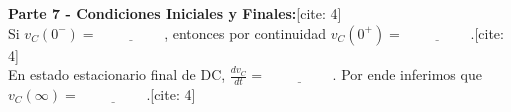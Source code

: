 \documentclass[11pt, a4paper]{article}
\begin{document}
\vspace{0.5cm}
\textbf{Parte 7 - Condiciones Iniciales y Finales:}[cite: 4]\\
Si $v_C(0^-) = \underline{\hspace{2cm}}$, entonces por continuidad $v_C(0^+) = \underline{\hspace{2cm}}$.[cite: 4]\\
En estado estacionario final de DC, $\frac{dv_C}{dt} = \underline{\hspace{2cm}}$. Por ende inferimos que $v_C(\infty) = \underline{\hspace{2cm}}$.[cite: 4]
\end{document}
